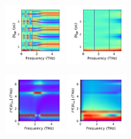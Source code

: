 \documentclass[a4paper]{article}
\begin{document}
\begin{figure}[H]
  \centering
  \includegraphics[width=0.23\textwidth]{cond_pcolor-A1-v3-imp0.pdf}
  \includegraphics[width=0.23\textwidth]{cond_pcolor-A1-v3-imp3.pdf}
\end{figure}
\begin{figure}[H]
  \centering
  \includegraphics[width=0.23\textwidth]{cond_w_pcolor-A1-v3-imp0.pdf}
  \includegraphics[width=0.23\textwidth]{cond_w_pcolor-A1-v3-imp3.pdf}
\end{figure}
\end{document}

